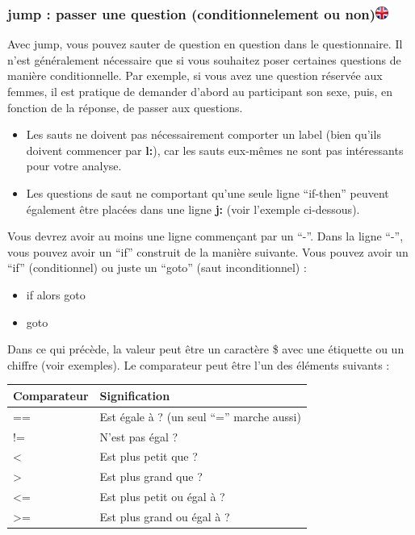 \documentclass[
]{book}
\providecommand{\tightlist}{%
  \setlength{\itemsep}{0pt}\setlength{\parskip}{0pt}}
\begin{document}
\hypertarget{jump-passer-une-question-conditionnelement-ou-non}{%
\subsubsection[jump : passer une question (conditionnelement ou
non)]{\texorpdfstring{jump : passer une question (conditionnelement ou
non)\href{https://www.psytoolkit.org/doc3.1.0/online-survey-syntax.html\#jump}{\protect\includegraphics{img/ukflag.png}}}{jump : passer une question (conditionnelement ou non)}}\label{jump-passer-une-question-conditionnelement-ou-non}}

Avec jump, vous pouvez sauter de question en question dans le
questionnaire. Il n'est généralement nécessaire que si vous souhaitez
poser certaines questions de manière conditionnelle. Par exemple, si
vous avez une question réservée aux femmes, il est pratique de demander
d'abord au participant son sexe, puis, en fonction de la réponse, de
passer aux questions.

\begin{itemize}
\tightlist
\item
  Les sauts ne doivent pas nécessairement comporter un label (bien
  qu'ils doivent commencer par \textbf{l:}), car les sauts eux-mêmes ne
  sont pas intéressants pour votre analyse.
\item
  Les questions de saut ne comportant qu'une seule ligne ``if-then''
  peuvent également être placées dans une ligne \textbf{j:} (voir
  l'exemple ci-dessous).
\end{itemize}

Vous devrez avoir au moins une ligne commençant par un ``-''. Dans la
ligne ``-'', vous pouvez avoir un ``if'' construit de la manière
suivante. Vous pouvez avoir un ``if'' (conditionnel) ou juste un
``goto'' (saut inconditionnel) :

\begin{itemize}
\tightlist
\item
  if alors goto 
\item
  goto 
\end{itemize}

Dans ce qui précède, la valeur peut être un caractère \$ avec une
étiquette ou un chiffre (voir exemples). Le comparateur peut être l'un
des éléments suivants :

\begin{longtable}[]{@{}ll@{}}
\toprule
Comparateur & Signification\tabularnewline
\midrule
\endhead
== & Est égale à ? (un seul ``='' marche aussi)\tabularnewline
!= & N'est pas égal ?\tabularnewline
\textless{} & Est plus petit que ?\tabularnewline
\textgreater{} & Est plus grand que ?\tabularnewline
\textless= & Est plus petit ou égal à ?\tabularnewline
\textgreater= & Est plus grand ou égal à ?\tabularnewline
\bottomrule
\end{longtable}
\end{document}
